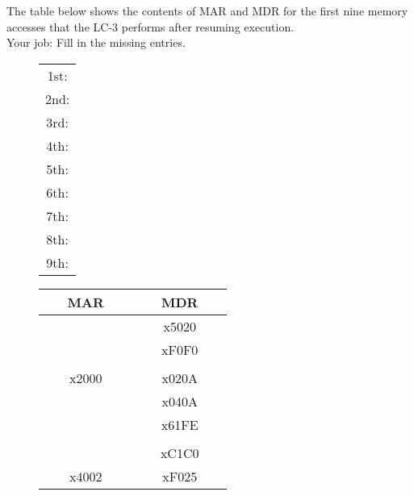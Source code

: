 \documentclass{patt}
\begin{document}
\begin{exercises}
\noindent The table below shows the contents of MAR and MDR for the first nine
memory accesses that the LC-3 performs after resuming execution.\\

\noindent Your job: Fill in the missing entries.\\

\begin{figure}[h!]
    \centering
    \begin{minipage}[h!]{1.0in}

\begin{tabular}{c}
\\
\raisebox{0.25in}{} 1st:\\
\raisebox{0.25in}{} 2nd:\\
\raisebox{0.25in}{} 3rd:\\
\raisebox{0.25in}{} 4th:\\
\raisebox{0.25in}{} 5th:\\
\raisebox{0.25in}{} 6th:\\
\raisebox{0.25in}{} 7th:\\
\raisebox{0.25in}{} 8th:\\
\raisebox{0.25in}{} 9th:\\
\end{tabular}
\end{minipage}
    \hspace{-0.6in}\begin{minipage}[h!]{1.0in}

\begin{tabular}{|c|c|} \hline
\ \ \ MAR\ \ \  & \ \ \ MDR\ \ \ \\
\hline
\raisebox{0.25in}{} & x5020\\
\hline
\raisebox{0.25in}{} & xF0F0\\
\hline
\raisebox{0.25in}{} &\\
\hline
\raisebox{0.25in}{} x2000 & x020A\\
\hline
\raisebox{0.25in}{} & x040A\\
\hline
\raisebox{0.25in}{} & x61FE\\
\hline
\raisebox{0.25in}{} & \\
\hline
\raisebox{0.25in}{} & xC1C0\\
\hline
\raisebox{0.25in}{} x4002 & xF025\\
\hline
\end{tabular}
\end{minipage}
\end{figure}

\end{exercises}
\end{document}
